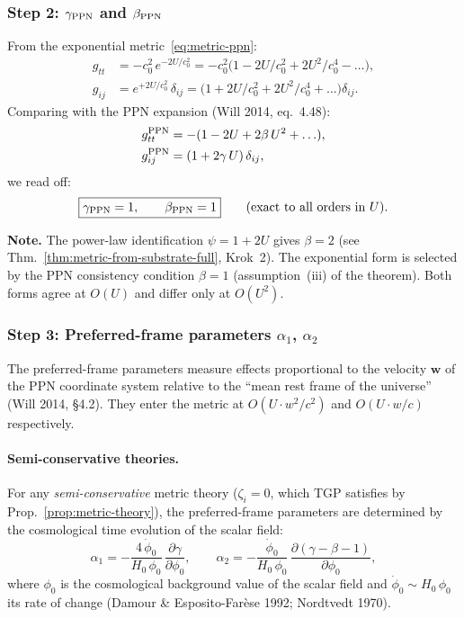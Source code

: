 \subsubsection{Step 2: $\gamma_{\rm PPN}$ and $\beta_{\rm PPN}$}

From the exponential metric~\eqref{eq:metric-ppn}:
\begin{align}
  g_{tt} &= -c_0^2\,e^{-2U/c_0^2}
  = -c_0^2\bigl(1 - 2U/c_0^2 + 2U^2/c_0^4 - \ldots\bigr), \\
  g_{ij} &= e^{+2U/c_0^2}\,\delta_{ij}
  = \bigl(1 + 2U/c_0^2 + 2U^2/c_0^4 + \ldots\bigr)\delta_{ij}.
\end{align}
Comparing with the PPN expansion (Will 2014, eq.~4.48):
\begin{align}
  g_{tt}^{\rm PPN} &= -(1 - 2U + 2\beta\,U^2 + \ldots), \\
  g_{ij}^{\rm PPN} &= (1 + 2\gamma\,U)\,\delta_{ij},
\end{align}
we read off:
\begin{equation}\label{eq:gamma-beta}
  \boxed{\gamma_{\rm PPN} = 1, \qquad \beta_{\rm PPN} = 1}
  \qquad \text{(exact to all orders in $U$)}.
\end{equation}

\noindent\textbf{Note.}
The power-law identification $\psi = 1 + 2U$ gives $\beta = 2$
(see Thm.~\ref{thm:metric-from-substrate-full}, Krok~2).
The exponential form is selected by the PPN consistency
condition $\beta = 1$ (assumption~(iii) of the theorem).
Both forms agree at $O(U)$ and differ only at $O(U^2)$.

\subsubsection{Step 3: Preferred-frame parameters $\alpha_1$, $\alpha_2$}

The preferred-frame parameters measure effects proportional to
the velocity $\mathbf{w}$ of the PPN coordinate system relative
to the ``mean rest frame of the universe'' (Will 2014, \S4.2).
They enter the metric at $O(U \cdot w^2/c^2)$ and $O(U \cdot w/c)$
respectively.

\paragraph{Semi-conservative theories.}
For any \emph{semi-conservative} metric theory ($\zeta_i = 0$,
which TGP satisfies by Prop.~\ref{prop:metric-theory}), the
preferred-frame parameters are determined by the cosmological
time evolution of the scalar field:
\begin{equation}\label{eq:alpha-from-phi-dot}
  \alpha_1 = -\frac{4\,\dot\phi_0}{H_0\,\phi_0}\,\frac{\partial\gamma}{\partial\phi_0},
  \qquad
  \alpha_2 = -\frac{\dot\phi_0}{H_0\,\phi_0}\,\frac{\partial(\gamma - \beta - 1)}{\partial\phi_0},
\end{equation}
where $\phi_0$ is the cosmological background value of the scalar
field and $\dot\phi_0 \sim H_0\,\phi_0$ its rate of change
(Damour \& Esposito-Far\`ese 1992; Nordtvedt 1970).

